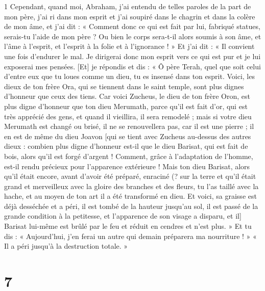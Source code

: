 \par 1 Cependant, quand moi, Abraham, j'ai entendu de telles paroles de la part de mon père, j'ai ri dans mon esprit et j'ai soupiré dans le chagrin et dans la colère de mon âme, et j'ai dit : « Comment donc ce qui est fait par lui, fabriqué statues, serais-tu l'aide de mon père ? Ou bien le corps sera-t-il alors soumis à son âme, et l'âme à l'esprit, et l'esprit à la folie et à l'ignorance ! » Et j’ai dit : « Il convient une fois d’endurer le mal. Je dirigerai donc mon esprit vers ce qui est pur et je lui exposerai mes pensées. [Et] je répondis et dis : « Ô père Terah, quel que soit celui d’entre eux que tu loues comme un dieu, tu es insensé dans ton esprit. Voici, les dieux de ton frère Ora, qui se tiennent dans le saint temple, sont plus dignes d'honneur que ceux des tiens. Car voici Zucheus, le dieu de ton frère Oron, est plus digne d'honneur que ton dieu Merumath, parce qu'il est fait d'or, qui est très apprécié des gens, et quand il vieillira, il sera remodelé ; mais si votre dieu Merumath est changé ou brisé, il ne se renouvellera pas, car il est une pierre ; il en est de même du dieu Joavon [qui se tient avec Zucheus au-dessus des autres dieux : combien plus digne d'honneur est-il que le dieu Barisat, qui est fait de bois, alors qu'il est forgé d'argent ! Comment, grâce à l'adaptation de l'homme, est-il rendu précieux pour l'apparence extérieure ! Mais ton dieu Barisat, alors qu'il était encore, avant d'avoir été préparé, enraciné (? sur la terre et qu'il était grand et merveilleux avec la gloire des branches et des fleurs, tu l'as taillé avec la hache, et au moyen de ton art il a été transformé en dieu. Et voici, sa graisse est déjà desséchée et a péri, il est tombé de la hauteur jusqu'au sol, il est passé de la grande condition à la petitesse, et l'apparence de son visage a disparu, et il] Barisat lui-même est brûlé par le feu et réduit en cendres et n'est plus. » Et tu dis : « Aujourd'hui, j'en ferai un autre qui demain préparera ma nourriture ! » « Il a péri jusqu'à la destruction totale. »

\chapter{7}

